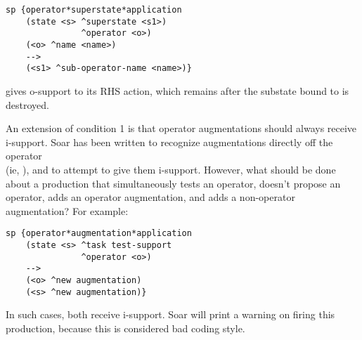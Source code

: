 \begin{verbatim}
sp {operator*superstate*application
    (state <s> ^superstate <s1>)
               ^operator <o>)
    (<o> ^name <name>)
    -->
    (<s1> ^sub-operator-name <name>)}
\end{verbatim}

gives o-support to its RHS action, which remains after the substate bound to  is destroyed. 

An extension of condition 1 is that operator augmentations should always receive i-support. Soar has been written to recognize augmentations directly off the operator \\
(ie, ), and to attempt to give them i-support. However, what should be done about a production that simultaneously tests an operator, doesn't propose an operator, adds an operator augmentation, and adds a non-operator augmentation? For example:

\begin{verbatim}
sp {operator*augmentation*application
    (state <s> ^task test-support
               ^operator <o>)
    -->
    (<o> ^new augmentation)
    (<s> ^new augmentation)}
\end{verbatim}


In such cases, both receive i-support. Soar will print a warning on firing this production, because this is considered bad coding style.

